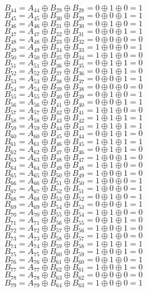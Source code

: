 \documentclass[12pt,onecolumn]{article}
\begin{document}
$$B_{44} = A_{44} \oplus B_{29} \oplus B_{28} = 0 \oplus 1 \oplus 0 = 1$$
$$B_{45} = A_{45} \oplus B_{30} \oplus B_{29} = 0 \oplus 0 \oplus 1 = 1$$
$$B_{46} = A_{46} \oplus B_{31} \oplus B_{30} = 0 \oplus 1 \oplus 0 = 1$$
$$B_{47} = A_{47} \oplus B_{32} \oplus B_{31} = 0 \oplus 0 \oplus 1 = 1$$
$$B_{48} = A_{48} \oplus B_{33} \oplus B_{32} = 0 \oplus 0 \oplus 0 = 0$$
$$B_{49} = A_{49} \oplus B_{34} \oplus B_{33} = 1 \oplus 0 \oplus 0 = 1$$
$$B_{50} = A_{50} \oplus B_{35} \oplus B_{34} = 1 \oplus 1 \oplus 0 = 0$$
$$B_{51} = A_{51} \oplus B_{36} \oplus B_{35} = 0 \oplus 1 \oplus 1 = 0$$
$$B_{52} = A_{52} \oplus B_{37} \oplus B_{36} = 0 \oplus 1 \oplus 1 = 0$$
$$B_{53} = A_{53} \oplus B_{38} \oplus B_{37} = 0 \oplus 0 \oplus 1 = 1$$
$$B_{54} = A_{54} \oplus B_{39} \oplus B_{38} = 0 \oplus 0 \oplus 0 = 0$$
$$B_{55} = A_{55} \oplus B_{40} \oplus B_{39} = 0 \oplus 1 \oplus 0 = 1$$
$$B_{56} = A_{56} \oplus B_{41} \oplus B_{40} = 0 \oplus 0 \oplus 1 = 1$$
$$B_{57} = A_{57} \oplus B_{42} \oplus B_{41} = 1 \oplus 1 \oplus 0 = 0$$
$$B_{58} = A_{58} \oplus B_{43} \oplus B_{42} = 1 \oplus 1 \oplus 1 = 1$$
$$B_{59} = A_{59} \oplus B_{44} \oplus B_{43} = 1 \oplus 1 \oplus 1 = 1$$
$$B_{60} = A_{60} \oplus B_{45} \oplus B_{44} = 0 \oplus 1 \oplus 1 = 0$$
$$B_{61} = A_{61} \oplus B_{46} \oplus B_{45} = 1 \oplus 1 \oplus 1 = 1$$
$$B_{62} = A_{62} \oplus B_{47} \oplus B_{46} = 0 \oplus 1 \oplus 1 = 0$$
$$B_{63} = A_{63} \oplus B_{48} \oplus B_{47} = 1 \oplus 0 \oplus 1 = 0$$
$$B_{64} = A_{64} \oplus B_{49} \oplus B_{48} = 1 \oplus 1 \oplus 0 = 0$$
$$B_{65} = A_{65} \oplus B_{50} \oplus B_{49} = 1 \oplus 0 \oplus 1 = 0$$
$$B_{66} = A_{66} \oplus B_{51} \oplus B_{50} = 1 \oplus 0 \oplus 0 = 1$$
$$B_{67} = A_{67} \oplus B_{52} \oplus B_{51} = 1 \oplus 0 \oplus 0 = 1$$
$$B_{68} = A_{68} \oplus B_{53} \oplus B_{52} = 0 \oplus 1 \oplus 0 = 1$$
$$B_{69} = A_{69} \oplus B_{54} \oplus B_{53} = 0 \oplus 0 \oplus 1 = 1$$
$$B_{70} = A_{70} \oplus B_{55} \oplus B_{54} = 1 \oplus 1 \oplus 0 = 0$$
$$B_{71} = A_{71} \oplus B_{56} \oplus B_{55} = 0 \oplus 1 \oplus 1 = 0$$
$$B_{72} = A_{72} \oplus B_{57} \oplus B_{56} = 1 \oplus 0 \oplus 1 = 0$$
$$B_{73} = A_{73} \oplus B_{58} \oplus B_{57} = 1 \oplus 1 \oplus 0 = 0$$
$$B_{74} = A_{74} \oplus B_{59} \oplus B_{58} = 1 \oplus 1 \oplus 1 = 1$$
$$B_{75} = A_{75} \oplus B_{60} \oplus B_{59} = 1 \oplus 0 \oplus 1 = 0$$
$$B_{76} = A_{76} \oplus B_{61} \oplus B_{60} = 0 \oplus 1 \oplus 0 = 1$$
$$B_{77} = A_{77} \oplus B_{62} \oplus B_{61} = 1 \oplus 0 \oplus 1 = 0$$
$$B_{78} = A_{78} \oplus B_{63} \oplus B_{62} = 0 \oplus 0 \oplus 0 = 0$$
$$B_{79} = A_{79} \oplus B_{64} \oplus B_{63} = 1 \oplus 0 \oplus 0 = 1$$
\end{document}
